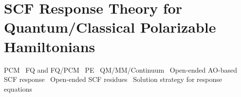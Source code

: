 \section{SCF Response Theory for Quantum/Classical Polarizable Hamiltonians}\label{sec:csm-response}

\acrshort{PCM}~\autocite{Cammi1994-qj, Cammi1996-wf, Cammi1996-vx,
Cammi1999-rb, Cammi2003-qy, Frediani2005-nc, Ferrighi2010-pm}
\acrshort{FQ} and \acrshort{FQ}/\acrshort{PCM}~\autocite{Lipparini2012-hx, Lipparini2012-tl, Lipparini2013-ud}
\acrshort{PE}~\autocite{Olsen2010-wa}
\acrshort{QM}/\acrshort{MM}/Continuum~\autocite{Steindal2011-ki, Caprasecca2012-ir}
Open-ended \acrshort{AO}-based \acrshort{SCF} response~\autocite{
Larsen2000-hj, Kjaergaard2008-hy, Thorvaldsen2008-sg,
Kristensen2008-hv, Ringholm2014-gx}
Open-ended \acrshort{SCF} residues~\autocite{Friese2015-kb}
\autocite{pcm-openrsp}
Solution strategy for response equations~\autocite{Saad2003-oa,
Saad2011-gm, Kauczor2011-rd, Malmqvist2013-vw}

